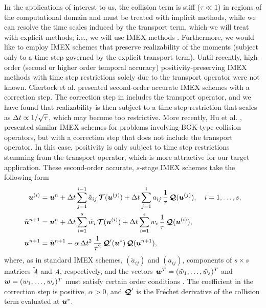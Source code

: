 In the applications of interest to us, the collision term is stiff ($\tau\ll1$) in regions of the computational domain and must be treated with implicit methods, while we can resolve the time scales induced by the transport term, which we will treat with explicit methods; i.e., we will use IMEX methods \cite{pareschiRusso_2005}.  
Furthermore, we would like to employ IMEX schemes that preserve realizability of the moments (subject only to a time step governed by the explicit transport term).  
Until recently, high-order (second or higher order temporal accuracy) positivity-preserving IMEX methods with time step restrictions solely due to the transport operator were not known.  
Chertock et al. \cite{chertock_etal_2015} presented second-order accurate IMEX schemes with a correction step.  
The correction step in \cite{chertock_etal_2015} includes the transport operator, and we have found that realizability is then subject to a time step restriction that scales as $\Delta t\propto1/\sqrt{\tau}$, which may become too restrictive.  
More recently, Hu et al. \cite{hu_etal_2017}, presented similar IMEX schemes for problems involving BGK-type collision operators, but with a correction step that does not include the transport operator.  
In this case, positivity is only subject to time step restrictions stemming from the transport operator, which is more attractive for our target application.  
These second-order accurate, $s$-stage IMEX schemes take the following form \cite{hu_etal_2017}
\begin{align}
  \boldsymbol{u}^{(i)}
  &=\boldsymbol{u}^{n}
  +\Delta t\sum_{j=1}^{i-1}\tilde{a}_{ij}\,\boldsymbol{\mathcal{T}}(\boldsymbol{u}^{(j)})
  +\Delta t\sum_{j=1}^{i}a_{ij}\,\frac{1}{\tau}\,\boldsymbol{\mathcal{Q}}(\boldsymbol{u}^{(j)}),
  \quad i=1,\ldots,s, \label{imexStages} \\
  \tilde{\boldsymbol{u}}^{n+1}
  &=\boldsymbol{u}^{n}
  +\Delta t\sum_{i=1}^{s}\tilde{w}_{i}\,\boldsymbol{\mathcal{T}}(\boldsymbol{u}^{(i)})
  +\Delta t\sum_{i=1}^{s}w_{i}\,\frac{1}{\tau}\,\boldsymbol{\mathcal{Q}}(\boldsymbol{u}^{(i)}), \label{imexIntermediate} \\
  \boldsymbol{u}^{n+1}
  &=\tilde{\boldsymbol{u}}^{n+1}-\alpha\,\Delta t^{2}\,\frac{1}{\tau^{2}}\,\boldsymbol{\mathcal{Q}}'(\boldsymbol{u}^{*})\,\boldsymbol{\mathcal{Q}}(\boldsymbol{u}^{n+1}), \label{eq:imexCorrection}
\end{align}
where, as in standard IMEX schemes, $(\tilde{a}_{ij})$ and $(a_{ij})$, components of $s\times s$ matrices $\tilde{A}$ and $A$, respectively, and the vectors $\boldsymbol{w}^{T}=(\tilde{w}_{1},\ldots,\tilde{w}_{s})^{T}$ and $\boldsymbol{w}=(w_{1},\ldots,w_{s})^{T}$ must satisfy certain order conditions \cite{pareschiRusso_2005}.  
The coefficient in the correction step is positive, $\alpha>0$, and $\boldsymbol{\mathcal{Q}}'$ is the Fr{\'e}chet derivative of the collision term evaluated at $\boldsymbol{u}^{*}$.  
